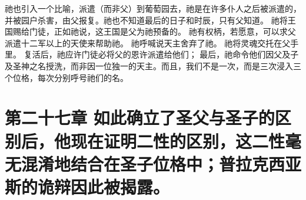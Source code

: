 祂也引入一个比喻，派遣（而非父）到葡萄园去，祂是在许多仆人之后被派遣的，并被园户杀害，由父报复。祂也不知道最后的日子和时辰，只有父知道。 祂将王国赐给门徒，正如祂说，这王国是父为祂预备的。 祂有权柄，若愿意，可以求父派遣十二军以上的天使来帮助祂。 祂呼喊说天主舍弃了祂。 祂将灵魂交托在父手里。 复活后，祂应许门徒必将父的恩许派遣给他们； 最后，祂命令他们因父及子及圣神之名授洗，而非因一位独一的天主。而且，我们不是一次，而是三次浸入三个位格，每次分别呼号祂们的名。\par


\section{第二十七章 如此确立了圣父与圣子的区别后，他现在证明二性的区别，这二性毫无混淆地结合在圣子位格中；普拉克西亚斯的诡辩因此被揭露。}

